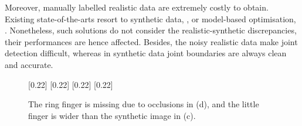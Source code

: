 Moreover, 
manually labelled realistic data are extremely costly to obtain. Existing state-of-the-arts resort to synthetic data, \eg \cite{Keskin2012}, or model-based optimisation, \eg \cite{LaGorce2011, Oikonomidis2012}. Nonetheless, such solutions do not consider the realistic-synthetic discrepancies, their performances are hence affected. Besides, the noisy realistic data make joint detection difficult, whereas in synthetic data joint boundaries are always clean and accurate.


\begin{figure}
\centering 
{}[0.22\linewidth]{  }
[0.22\linewidth]{  }
[0.22\linewidth]{  }
[0.22\linewidth]{  }
\caption{The ring finger is missing due to occlusions in (d), and the little finger is wider than the synthetic image in (c).}
\label{fig/hand/intro}
\end{figure}

